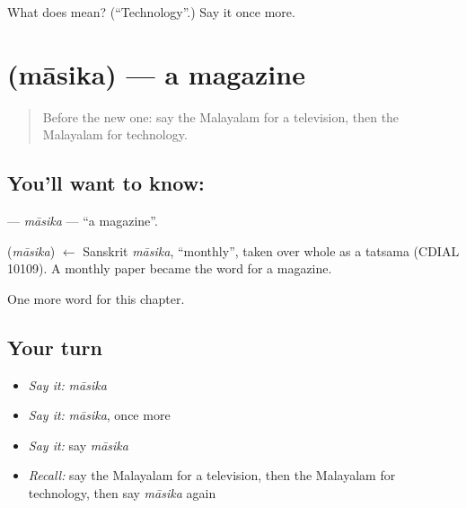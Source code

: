 \begin{tcolorbox}[breakable,colback=teal!4,colframe=teal!35!black,title={Before you move on}]
What does  mean? (\textquotedblleft{}Technology\textquotedblright{}.) Say it once more.
\end{tcolorbox}
\section[\texorpdfstring{\ml{മാസിക} (māsika)}{മാസിക (māsika)}]{ (māsika) — a magazine}

\label{lesson:ML-C293-masika}



\begin{quote}
Before the new one: say the Malayalam for a television, then the Malayalam for technology.
\end{quote}

\subsection*{You'll want to know: }
\textbf{} — \emph{māsika} — \textquotedblleft{}a magazine\textquotedblright{}.

\begin{cousinweb}
\textbf{} (\emph{māsika}) $\leftarrow$ Sanskrit \emph{māsika}, \textquotedblleft{}monthly\textquotedblright{}, taken over whole as a tatsama (CDIAL 10109). A monthly paper became the word for a magazine.
\end{cousinweb}

\begin{grammarlens}[title={What you've built}]
One more word for this chapter.
\end{grammarlens}

\subsection*{Your turn}
\begin{itemize}
\raggedright
  \item \emph{Say it:} \emph{māsika}
  \item \emph{Say it:} \emph{māsika}, once more
  \item \emph{Say it:} say \emph{māsika}
  \item \emph{Recall:} say the Malayalam for a television, then the Malayalam for technology, then say \emph{māsika} again
\end{itemize}

